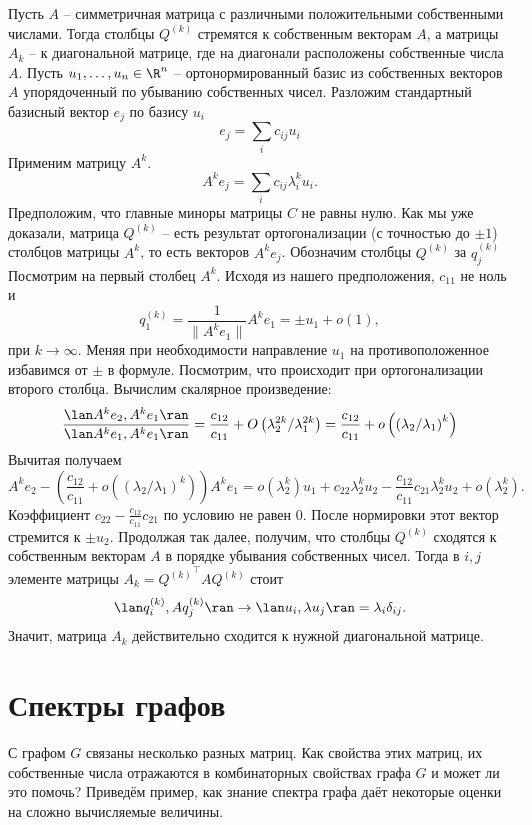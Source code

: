 \thrm Пусть $A$ -- симметричная матрица с различными положительными собственными числами. Тогда столбцы $Q^{(k)}$ стремятся к собственным векторам $A$, а матрицы $A_k$ -- к диагональной матрице, где на диагонали расположены собственные числа $A$.
\ethrm
\proof  Пусть $u_1,\dots,u_n \in \R^n$ -- ортонормированный базис из собственных векторов $A$ упорядоченный по убыванию собственных чисел.
Разложим стандартный базисный вектор $e_j$ по базису $u_i$
$$e_j = \sum_i c_{ij} u_i $$
Применим матрицу $A^k$. 
$$A^k e_j = \sum_i c_{ij} \lambda_i^k u_i.$$
Предположим, что главные миноры матрицы $C$ не равны нулю.
Как мы уже доказали, матрица $Q^{(k)}$ -- есть результат ортогонализации (с точностью до $\pm 1$) столбцов матрицы $A^k$, то есть векторов $A^k e_j$. Обозначим столбцы $Q^{(k)}$ за $q^{(k)}_j$ Посмотрим на первый столбец $A^k$. Исходя из нашего предположения, $c_{11}$ не ноль и
$$q^{(k)}_1=\frac1{\|A^ke_1\|} A^k e_1 = \pm u_1 + o(1),$$
при $k\to \infty$. Меняя при необходимости направление $u_1$ на противоположенное избавимся от $\pm$ в формуле. Посмотрим, что происходит при ортогонализации второго столбца. Вычислим скалярное произведение:
$$\frac{\lan A^k e_2, A^k e_1 \ran}{\lan A^k e_1, A^k e_1 \ran} = \frac{c_{12}}{c_{11}}+ O\left( \lambda_2^{2k}/\lambda_1^{2k}\right)
=\frac{c_{12}}{c_{11}}+ o \left(\left(\lambda_2/\lambda_1 \right)^k\right)  $$
Вычитая получаем
$$ A^k e_2 - \left(\frac{c_{12}}{c_{11}}+ o \left(\left(\lambda_2/\lambda_1\right)^k\right)\right) A^k e_1= o(\lambda_2^k)u_1+ c_{22}\lambda_2^ku_2 - \frac{c_{12}}{c_{11}}c_{21}\lambda_2^k u_2 +o(\lambda_2^k).$$
Коэффициент $c_{22}-\frac{c_{12}}{c_{11}}c_{21}$ по условию не равен $0$. После нормировки этот вектор стремится к $\pm u_2$. Продолжая так далее, получим, что столбцы $Q^{(k)}$ сходятся к собственным векторам $A$ в порядке убывания собственных чисел. Тогда в $i,j$ элементе матрицы $A_k={Q^{(k)}}^\top A Q^{(k)}$  стоит
$$\lan q^{(k)}_i, Aq^{(k)}_j\ran \to \lan u_i, \lambda u_j \ran = \lambda_i \delta_{ij}.$$
Значит, матрица $A_k$ действительно сходится к нужной диагональной матрице.
\endproof



\section{Спектры графов}
С графом $G$ связаны несколько разных матриц. Как свойства этих матриц, их собственные числа отражаются в комбинаторных свойствах графа $G$ и может ли это помочь?
Приведём пример, как знание спектра графа даёт некоторые оценки на сложно вычисляемые величины.

